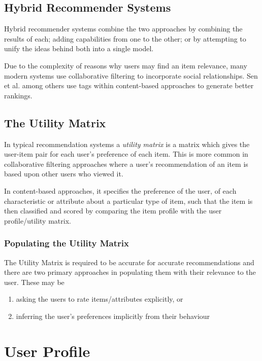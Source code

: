 \subsection{Hybrid Recommender Systems}

Hybrid recommender systems combine the two approaches by combining the results of each; adding capabilities from one to the other; or by attempting to unify the ideas behind both into a single model. 

Due to the complexity of reasons why users may find an item relevance, many modern systems \cite{ReferralWeb} use collaborative filtering to incorporate social relationships. Sen et al. \cite{SenTagommender} among others use tags within content-based approaches to generate better rankings. 

\subsection{The Utility Matrix}

In typical recommendation systems a \textit{utility matrix} is a matrix which gives the user-item pair for each user's preference of each item. This is more common in collaborative filtering approaches where a user's recommendation of an item is based upon other users who viewed it. 

In content-based approaches, it specifies the preference of the user, of each characteristic or attribute about a particular type of item, such that the item is then classified and scored by comparing the item profile with the user profile/utility matrix.

\subsubsection{Populating the Utility Matrix}

The Utility Matrix is required to be accurate for accurate recommendations and there are two primary approaches in populating them with their relevance to the user. These may be 
\begin{enumerate}
  \item asking the users to rate items/attributes explicitly, or
  \item inferring the user's preferences implicitly from their behaviour
\end{enumerate}

\section{User Profile}


